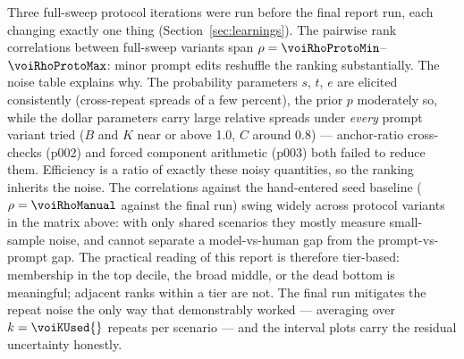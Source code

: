 
Three full-sweep protocol iterations were run before the final report run,
each changing exactly one thing (Section~\ref{sec:learnings}). The pairwise
rank correlations between full-sweep variants span
$\rho = \voiRhoProtoMin$--$\voiRhoProtoMax$: minor prompt edits reshuffle the
ranking substantially. The noise table explains why. The probability
parameters $s$, $t$, $e$ are elicited consistently (cross-repeat spreads of a
few percent), the prior $p$ moderately so, while the dollar parameters carry
large relative spreads under \emph{every} prompt variant tried ($B$ and $K$
near or above 1.0, $C$ around 0.8) --- anchor-ratio cross-checks (p002) and
forced component
arithmetic (p003) both failed to reduce them. Efficiency is a ratio of
exactly these noisy quantities, so the ranking inherits the noise. The
correlations against the hand-entered seed baseline
($\rho = \voiRhoManual$ against the final run) swing widely across protocol
variants in the matrix above: with only \voiRhoManualN{} shared scenarios
they mostly measure small-sample noise, and cannot separate a model-vs-human
gap from the prompt-vs-prompt gap. The
practical reading of this report is therefore tier-based: membership in the
top decile, the broad middle, or the dead bottom is meaningful; adjacent
ranks within a tier are not. The final run mitigates the repeat noise the
only way that demonstrably worked --- averaging over $k=\voiKUsed{}$
repeats per scenario --- and the interval plots carry the residual
uncertainty honestly.

